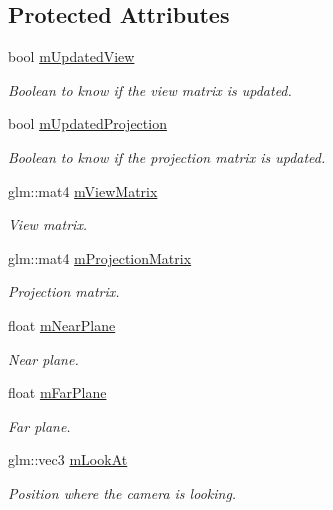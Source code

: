 \subsection*{Protected Attributes}
\begin{DoxyCompactItemize}
\item 
bool \hyperlink{class_camera_a814cf74a3cbe197060fc5dfef0d16d30}{m\+Updated\+View}
\begin{DoxyCompactList}\small\item\em Boolean to know if the view matrix is updated. \end{DoxyCompactList}\item 
bool \hyperlink{class_camera_a8c5b9764b6d3799ee7ff0f8fe219686e}{m\+Updated\+Projection}
\begin{DoxyCompactList}\small\item\em Boolean to know if the projection matrix is updated. \end{DoxyCompactList}\item 
glm\+::mat4 \hyperlink{class_camera_af3e5e12c45763fae6cbeaa24702bfa82}{m\+View\+Matrix}
\begin{DoxyCompactList}\small\item\em View matrix. \end{DoxyCompactList}\item 
glm\+::mat4 \hyperlink{class_camera_ac1fd207cb3b4c13e0109cb7391937ea2}{m\+Projection\+Matrix}
\begin{DoxyCompactList}\small\item\em Projection matrix. \end{DoxyCompactList}\item 
float \hyperlink{class_camera_abb0faed21056b2a7bca13285ae674382}{m\+Near\+Plane}
\begin{DoxyCompactList}\small\item\em Near plane. \end{DoxyCompactList}\item 
float \hyperlink{class_camera_a9c8dc48fb38b3512e1636cefc983715a}{m\+Far\+Plane}
\begin{DoxyCompactList}\small\item\em Far plane. \end{DoxyCompactList}\item 
glm\+::vec3 \hyperlink{class_camera_a299e44dc03ba5ad5b8f126d980db870f}{m\+Look\+At}
\begin{DoxyCompactList}\small\item\em Position where the camera is looking. \end{DoxyCompactList}\item 

\end{DoxyCompactItemize}

